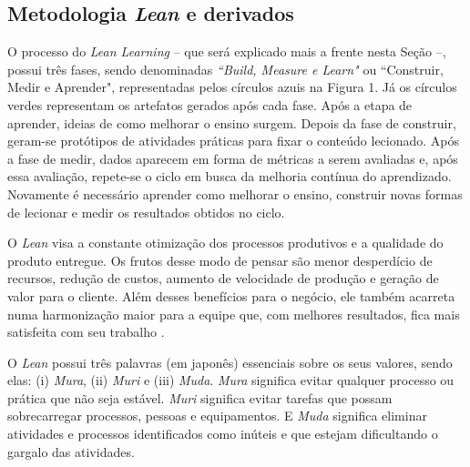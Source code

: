 \subsection{Metodologia \textit{Lean} e derivados}
O processo do \textit{Lean Learning} -- que será explicado mais a frente nesta Seção --, possui três fases, sendo denominadas \textit{``Build, Measure e Learn"} ou ``Construir, Medir e Aprender", representadas pelos círculos azuis na Figura 1. Já os círculos verdes representam os artefatos gerados após cada fase. Após a etapa de aprender, ideias de como melhorar o ensino surgem. Depois da fase de construir, geram-se protótipos de atividades práticas para fixar o conteúdo lecionado. Após a fase de medir, dados aparecem em forma de métricas a serem avaliadas e, após essa avaliação, repete-se o ciclo em busca da melhoria contínua do aprendizado. Novamente é necessário aprender como melhorar o ensino, construir novas formas de lecionar e medir os resultados obtidos no ciclo.

O \textit{Lean} visa a constante otimização dos processos produtivos e a qualidade do produto entregue. Os frutos desse modo de pensar são menor desperdício de recursos, redução de custos, aumento de velocidade de produção e geração de valor para o cliente. Além desses benefícios para o negócio, ele também acarreta numa harmonização maior para a equipe que, com melhores resultados, fica mais satisfeita com seu trabalho \cite{poth2019lean}.

O \textit{Lean} possui três palavras (em japonês) essenciais sobre os seus valores, sendo elas: (i) \textit{Mura}, (ii) \textit{Muri} e (iii) \textit{Muda}. \textit{Mura} significa evitar qualquer processo ou prática que não seja estável. \textit{Muri} significa evitar tarefas que possam sobrecarregar processos, pessoas e equipamentos. E \textit{Muda} significa eliminar atividades e processos identificados como inúteis e que estejam dificultando o gargalo das atividades.



